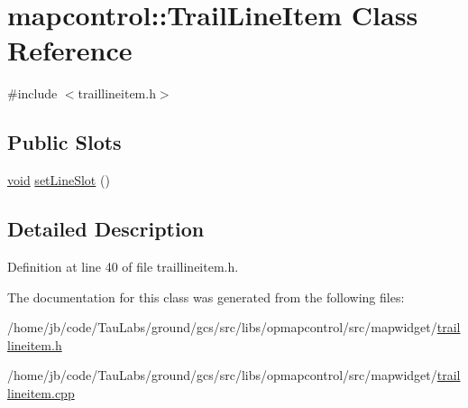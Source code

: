 \hypertarget{classmapcontrol_1_1_trail_line_item}{\section{mapcontrol\-:\-:\-Trail\-Line\-Item \-Class \-Reference}
\label{classmapcontrol_1_1_trail_line_item}
}


{\ttfamily \#include $<$traillineitem.\-h$>$}

\subsection*{\-Public \-Slots}
\begin{DoxyCompactItemize}
\item 
\hyperlink{group___u_a_v_objects_plugin_ga444cf2ff3f0ecbe028adce838d373f5c}{void} \hyperlink{group___o_p_map_widget_gaca380937db6013081d160fdcfed13e2f}{set\-Line\-Slot} ()
\end{DoxyCompactItemize}


\subsection{\-Detailed \-Description}


\-Definition at line 40 of file traillineitem.\-h.



\-The documentation for this class was generated from the following files\-:\begin{DoxyCompactItemize}
\item 
/home/jb/code/\-Tau\-Labs/ground/gcs/src/libs/opmapcontrol/src/mapwidget/\hyperlink{traillineitem_8h}{traillineitem.\-h}\item 
/home/jb/code/\-Tau\-Labs/ground/gcs/src/libs/opmapcontrol/src/mapwidget/\hyperlink{traillineitem_8cpp}{traillineitem.\-cpp}\end{DoxyCompactItemize}
